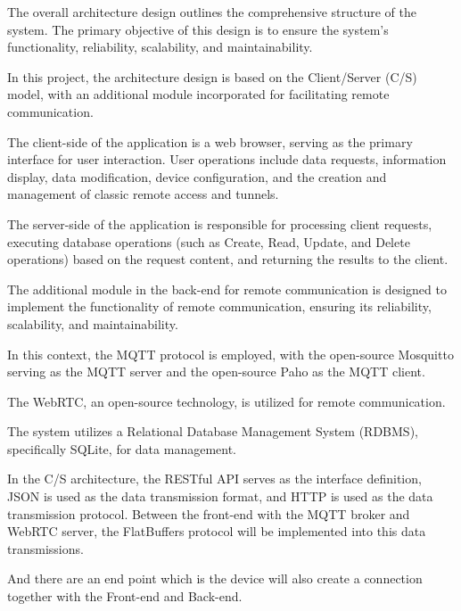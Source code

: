 
The overall architecture design outlines the comprehensive structure of the system. 
The primary objective of this design is to ensure the system's functionality, 
reliability, scalability, and maintainability.

In this project, the architecture design is based on the Client/Server (C/S) model, 
with an additional module incorporated for facilitating remote communication.

The client-side of the application is a web browser, serving as the primary interface 
for user interaction. User operations include data requests, information display, 
data modification, device configuration, and the creation 
and management of classic remote access and tunnels.

The server-side of the application is responsible for processing client requests, 
executing database operations (such as Create, Read, Update, and Delete operations) 
based on the request content, and returning the results to the client.

The additional module in the back-end for remote communication is designed to implement 
the functionality of remote communication, ensuring its reliability, scalability, 
and maintainability. 

In this context, the MQTT protocol is employed, 
with the open-source Mosquitto serving as the MQTT server 
and the open-source Paho as the MQTT client. 

The WebRTC, an open-source technology, 
is utilized for remote communication.

The system utilizes a Relational Database Management System (RDBMS), 
specifically SQLite, for data management.

In the C/S architecture, the RESTful API serves as the interface definition, 
JSON is used as the data transmission format, 
and HTTP is used as the data transmission protocol.
Between the front-end with the MQTT broker and WebRTC server, the FlatBuffers protocol
will be implemented into this data transmissions. 

And there are an end point which is the device will also create a connection together
with the Front-end and Back-end.